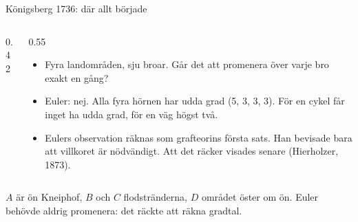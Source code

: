 {\kaninbg
\begin{frame}{\kh Königsberg 1736: där allt började}
\begin{columns}[T]
\begin{column}{0.42\textwidth}
\centering
{}
\end{column}
\begin{column}{0.55\textwidth}
\small
\begin{itemize}\setlength{\itemsep}{3pt}
  \item Fyra landområden, sju broar. Går det att promenera över varje bro exakt en gång?
  \item Euler: nej. Alla fyra hörnen har udda grad (5, 3, 3, 3). För en cykel får inget ha
        udda grad, för en väg högst två.
  \item Eulers observation räknas som grafteorins första sats. Han bevisade bara att villkoret
        är nödvändigt. Att det räcker visades senare (Hierholzer, 1873).
\end{itemize}
\end{column}
\end{columns}
\vfill
\begin{kaninbox}[fontupper=\footnotesize]
$A$ är ön Kneiphof, $B$ och $C$ flodstränderna, $D$ området öster om ön. Euler behövde aldrig
promenera: det räckte att räkna gradtal.
\end{kaninbox}
\end{frame}}

